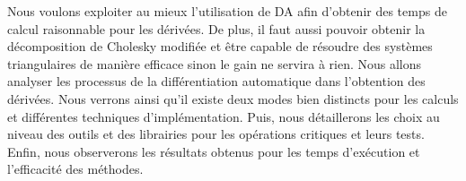 Nous voulons exploiter au mieux l'utilisation de DA afin d'obtenir des temps de calcul raisonnable pour les d\'eriv\'ees.
De plus, il faut aussi pouvoir obtenir la d\'ecomposition de Cholesky modifi\'ee et être capable de r\'esoudre des syst\`emes triangulaires de mani\`ere
efficace sinon le gain ne servira \`a rien.
 Nous allons analyser les processus de la diff\'erentiation automatique dans
l'obtention des d\'eriv\'ees. Nous verrons ainsi qu'il existe deux modes bien distincts pour les calculs et diff\'erentes techniques
d'impl\'ementation. Puis, nous d\'etaillerons les choix au niveau des outils et des librairies pour les op\'erations critiques et leurs tests.
 Enfin, nous observerons les r\'esultats obtenus pour les temps d'ex\'ecution et l'efficacit\'e des m\'ethodes.








